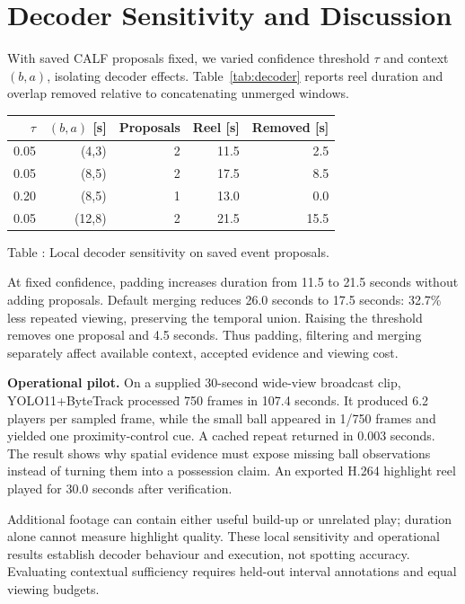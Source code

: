 \documentclass[10pt,twocolumn,letterpaper]{article}
\begin{document}
\section{Decoder Sensitivity and Discussion}
With saved CALF proposals fixed, we varied confidence threshold $\tau$ and context $(b,a)$, isolating decoder effects. Table~\ref{tab:decoder} reports reel duration and overlap removed relative to concatenating unmerged windows.
\begin{center}
\small
\begin{tabular}{rrrrr}
\toprule
$\tau$ & $(b,a)$ [s] & Proposals & Reel [s] & Removed [s] \\
\midrule
0.05 & (4,3) & 2 & 11.5 & 2.5 \\
0.05 & (8,5) & 2 & 17.5 & 8.5 \\
0.20 & (8,5) & 1 & 13.0 & 0.0 \\
0.05 & (12,8) & 2 & 21.5 & 15.5 \\
\bottomrule
\end{tabular}
\label{tab:decoder}
\par\smallskip Table \thetable: Local decoder sensitivity on saved event proposals.
\end{center}
At fixed confidence, padding increases duration from 11.5 to 21.5 seconds without adding proposals. Default merging reduces 26.0 seconds to 17.5 seconds: 32.7\% less repeated viewing, preserving the temporal union. Raising the threshold removes one proposal and 4.5 seconds. Thus padding, filtering and merging separately affect available context, accepted evidence and viewing cost.

\textbf{Operational pilot.} On a supplied 30-second wide-view broadcast clip, YOLO11+ByteTrack processed 750 frames in 107.4 seconds. It produced 6.2 players per sampled frame, while the small ball appeared in 1/750 frames and yielded one proximity-control cue. A cached repeat returned in 0.003 seconds. The result shows why spatial evidence must expose missing ball observations instead of turning them into a possession claim. An exported H.264 highlight reel played for 30.0 seconds after verification.

Additional footage can contain either useful build-up or unrelated play; duration alone cannot measure highlight quality. These local sensitivity and operational results establish decoder behaviour and execution, not spotting accuracy. Evaluating contextual sufficiency requires held-out interval annotations and equal viewing budgets.
\end{document}
